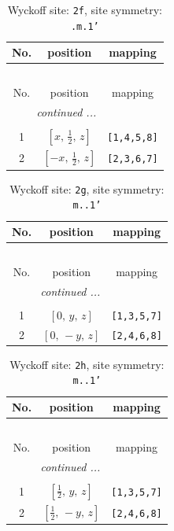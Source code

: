 \documentclass[fleqn,8pt]{jsarticle}
\begin{document}
\renewcommand{\arraystretch}{1.2}
\begin{longtable}{ccc}
\caption{Wyckoff site: {\tt 2f}, site symmetry: {\tt .m.1'}}
 \\
 \hline \hline
No. & position & mapping \\ \hline \endfirsthead

\multicolumn{2}{l}{\tablename\ \thetable{}} \\
 \hline \hline
No. & position & mapping \\ \hline \endhead

 \hline \hline
\multicolumn{2}{r}{\footnotesize\it continued ...} \\ \endfoot

 \hline \hline
\multicolumn{2}{r}{} \\ \endlastfoot

1 & $\left[ x,\, \frac{1}{2},\, z \right]$ & {\tt [1,4,5,8]} \\ \hline
2 & $\left[ - x,\, \frac{1}{2},\, z \right]$ & {\tt [2,3,6,7]} \\
\end{longtable}
\renewcommand{\arraystretch}{1.2}
\begin{longtable}{ccc}
\caption{Wyckoff site: {\tt 2g}, site symmetry: {\tt m..1'}}
 \\
 \hline \hline
No. & position & mapping \\ \hline \endfirsthead

\multicolumn{2}{l}{\tablename\ \thetable{}} \\
 \hline \hline
No. & position & mapping \\ \hline \endhead

 \hline \hline
\multicolumn{2}{r}{\footnotesize\it continued ...} \\ \endfoot

 \hline \hline
\multicolumn{2}{r}{} \\ \endlastfoot

1 & $\left[ 0,\, y,\, z \right]$ & {\tt [1,3,5,7]} \\ \hline
2 & $\left[ 0,\, - y,\, z \right]$ & {\tt [2,4,6,8]} \\
\end{longtable}
\renewcommand{\arraystretch}{1.2}
\begin{longtable}{ccc}
\caption{Wyckoff site: {\tt 2h}, site symmetry: {\tt m..1'}}
 \\
 \hline \hline
No. & position & mapping \\ \hline \endfirsthead

\multicolumn{2}{l}{\tablename\ \thetable{}} \\
 \hline \hline
No. & position & mapping \\ \hline \endhead

 \hline \hline
\multicolumn{2}{r}{\footnotesize\it continued ...} \\ \endfoot

 \hline \hline
\multicolumn{2}{r}{} \\ \endlastfoot

1 & $\left[ \frac{1}{2},\, y,\, z \right]$ & {\tt [1,3,5,7]} \\ \hline
2 & $\left[ \frac{1}{2},\, - y,\, z \right]$ & {\tt [2,4,6,8]} \\
\end{longtable}
\end{document}
